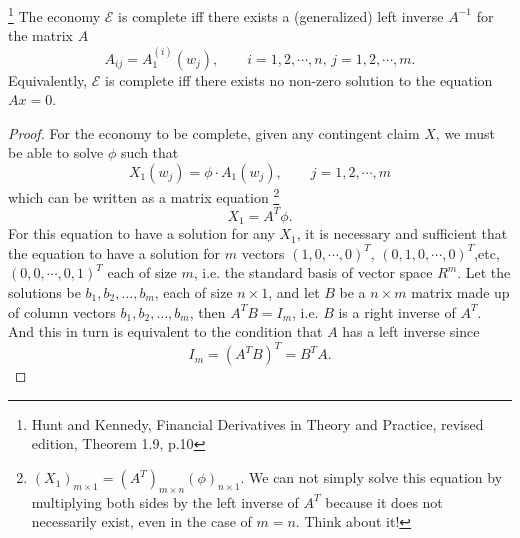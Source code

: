 \begin{theorem} \label{T:comp}
\footnote{Hunt and Kennedy, Financial Derivatives in Theory and Practice, 
    revised edition, Theorem 1.9, p.10}
The economy $\mathcal{E}$ is complete iff there exists a (generalized) left
inverse $A^{-1}$ for the matrix $A$
\[
  A_{ij} = A_1^{(i)}(w_j), \qquad i=1,2,\cdots,n, \, j=1,2,\cdots,m.
\]
Equivalently, $\mathcal{E}$ is complete iff there exists no non-zero solution to
the equation $Ax=0$.
\end{theorem}
\begin{proof}
For the economy to be complete, given any contingent claim $X$, we must be able
to solve $\phi$ such that
\[
  X_1(w_j) = \phi\cdot A_1(w_j), \qquad j=1,2,\cdots,m
\]
which can be written as a matrix equation
\footnote{ \textdbend $(X_1)_{m\times 1} = (A^T)_{m\times n} (\phi)_{n\times 1}$.
          We can not simply solve this equation by multiplying both sides
          by the left inverse of $A^T$ because it does not necessarily
          exist, even in the case of $m=n$. Think about it!}
\[
  X_1 = A^T \phi.
\]
For this equation to have a solution for any $X_1$, it is necessary and
sufficient that the equation to have a solution for $m$ vectors 
$(1,0,\cdots,0)^T$, $(0,1,0,\cdots,0)^T$,etc,$(0,0,\cdots,0,1)^T$ each of 
size $m$, i.e. the standard basis of vector space $R^m$.
Let the solutions be $b_1,b_2,\dots,b_m$, each of size $n\times 1$, and
let $B$ be a $n\times m$ matrix made up of column vectors
$b_1,b_2,\dots,b_m$, then $A^T B=I_m$, i.e. $B$ is a right inverse of $A^T$.
And this in turn is equivalent to the condition that $A$ has a left inverse 
since
\[
  I_m = (A^T B)^T = B^T A.
\]





\end{proof}

